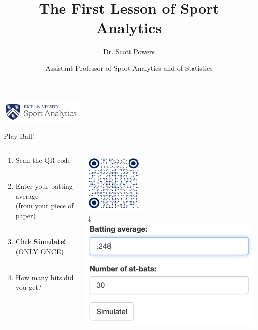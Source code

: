 \documentclass[handout]{beamer}
\title{The First Lesson of Sport Analytics}
\author{Dr. Scott Powers}
\date{\color{ricegray} Assistant Professor of Sport Analytics and of Statistics}
\begin{document}
  \begin{frame}
    \maketitle
    \vfill
    \hfill\includegraphics[width = 4cm]{images/rice_logo.png}
  \end{frame}

  \begin{frame}{Play Ball!}
    \begin{columns}
      \begin{column}{0.6\columnwidth}
        \begin{enumerate}
          \item Scan the QR code\\
          ~\\
          \item Enter your batting average\\
          (from your piece of paper)\\
          ~\\
          \item Click {\bf Simulate!} (ONLY ONCE)\\
          ~\\
          \item How many hits did you get?
        \end{enumerate}
      \end{column}
      \begin{column}{0.4\columnwidth}
        \centering
        \includegraphics[width=3cm]{images/qr_shinyapps.png}\\
        $\downarrow$\\
        \includegraphics[width=\textwidth]{images/shinyapps.png}
      \end{column}
    \end{columns}
  \end{frame}
\end{document}
